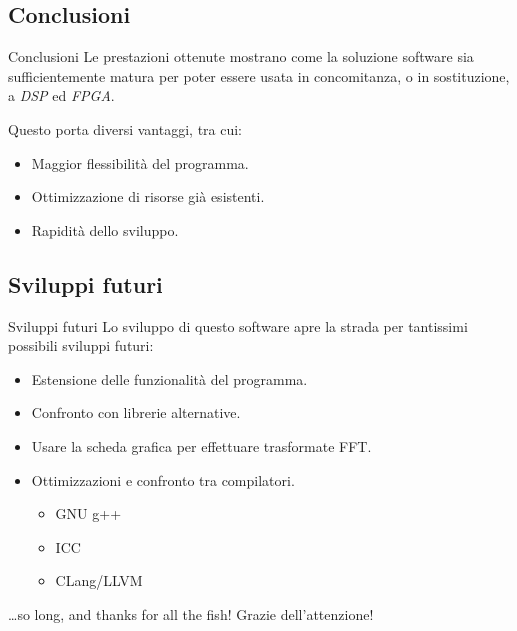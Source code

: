 \documentclass[red]{beamer}
\begin{document}
\subsection{Conclusioni}
\begin{frame}{Conclusioni}
	Le prestazioni ottenute mostrano come la soluzione software sia
	sufficientemente matura per poter essere usata in concomitanza, o in
	sostituzione, a \emph{DSP} ed \emph{FPGA}.

	\vspace{1cm}
	Questo porta diversi vantaggi, tra cui:
	\begin{itemize}
		\item Maggior flessibilità del programma.
		\item Ottimizzazione di risorse già esistenti.
		\item Rapidità dello sviluppo.
	\end{itemize}
\end{frame}
\subsection{Sviluppi futuri}
\begin{frame}{Sviluppi futuri}
	Lo sviluppo di questo software apre la strada per tantissimi possibili
	sviluppi futuri:
	\vspace{1cm}
	\begin{itemize}[<+->]
		\item Estensione delle funzionalità del programma.
		\item Confronto con librerie alternative.
		\item Usare la scheda grafica per effettuare trasformate FFT.
		\item Ottimizzazioni e confronto tra compilatori.
			\begin{itemize}[<+->]
				\item GNU g++
				\item ICC
				\item CLang/LLVM
			\end{itemize}
	\end{itemize}
\end{frame}
\begin{frame}{\ldots so long, and thanks for all the fish!}
	Grazie dell'attenzione!
\end{frame}
\end{document}
